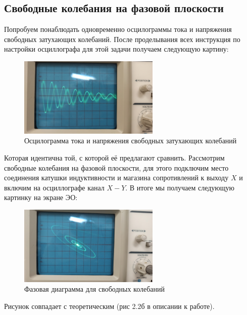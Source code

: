 \documentclass[a4paper, 12pt]{article}%
\begin{document}
\newpage
\subsection{Свободные колебания на фазовой плоскости}
Попробуем понаблюдать одновременно осцилограммы тока и напряжения свободных затухающих колебаний. После проделывания всех инструкция по настройки осциллографа для этой задачи получаем следующую картину:


\begin{figure}[h!]
\begin{center}
\includegraphics[width = 0.6\textwidth]{my2.jpg}
\caption{Осцилограмма тока и напряжения свободных затухающих колебаний}
\end{center}
\end{figure}


Которая идентична той, с которой её предлагают сравнить. Рассмотрим свободные колебания на фазовой плоскости, для этого подключим место соединения катушки индуктивности и магазина сопротивлений к выходу $X$ и включим на осциллографе канал $X-Y$. В итоге мы получаем следующую картинку на экране ЭО:

\begin{figure}[h!]
\begin{center}
\includegraphics[width = 0.6\textwidth]{my3.jpg}
\caption{Фазовая диаграмма для свободных колебаний}
\end{center}
\end{figure}

Рисунок совпадает с теоретическим (рис 2.2б в описании к работе).
\end{document}
